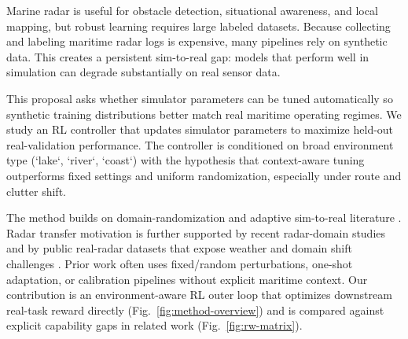 Marine radar is useful for obstacle detection, situational awareness, and local mapping, but robust learning requires large labeled datasets. Because collecting and labeling maritime radar logs is expensive, many pipelines rely on synthetic data. This creates a persistent sim-to-real gap: models that perform well in simulation can degrade substantially on real sensor data.

This proposal asks whether simulator parameters can be tuned automatically so synthetic training distributions better match real maritime operating regimes. We study an RL controller that updates simulator parameters to maximize held-out real-validation performance. The controller is conditioned on broad environment type (`lake`, `river`, `coast`) with the hypothesis that context-aware tuning outperforms fixed settings and uniform randomization, especially under route and clutter shift.

The method builds on domain-randomization and adaptive sim-to-real literature \cite{tobin2017domain,peng2018sim,chebotar2018simopt,ramos2019bayessim,muratore2020bayrn,openai2019rubik,josifovski2024cdr,ho2020rap,zhao2020sim2real}. Radar transfer motivation is further supported by recent radar-domain studies \cite{kim2024soft,trinh2026digitaltwin} and by public real-radar datasets that expose weather and domain shift challenges \cite{sheeny2020radiate,ouaknine2020carrada,schumann2021radarscenes,choi2024polaris,zust2023lars}. Prior work often uses fixed/random perturbations, one-shot adaptation, or calibration pipelines without explicit maritime context. Our contribution is an environment-aware RL outer loop that optimizes downstream real-task reward directly (Fig.~\ref{fig:method-overview}) and is compared against explicit capability gaps in related work (Fig.~\ref{fig:rw-matrix}).

